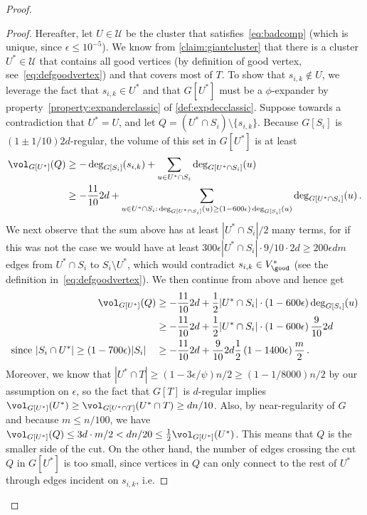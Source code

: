 \begin{proof}
\begin{proof}
	Hereafter, let $U \in \mathcal{U}$ be the cluster that satisfies~\eqref{eq:badcomp} (which is unique, since $\epsilon \le 10^{-5}$). We know from \cref{claim:giantcluster} that there is a cluster $U^* \in \mathcal{U}$ that contains all good vertices (by definition of good vertex, see~\eqref{eq:defgoodvertex}) and that covers most of $T$.	To show that $s_{i,k} \notin U$, we leverage the fact that $s_{i,k} \in U^*$ and that $G[U^*]$ must be a $\phi$-expander by property~\eqref{property:expanderclassic} of \cref{def:expdecclassic}. Suppose towards a contradiction that $U^* = U$, and let $Q = (U^* \cap S_i) \setminus \{s_{i,k}\}$. Because $G[S_i]$ is $(1 \pm 1/10)2d$-regular, the volume of this set in $G[U^*]$ is at least
	\begin{align*}
		\vol_{G[U^*]}(Q) & \ge -\deg_{G[S_i]}(s_{i,k}) + \sum_{u \in U^* \cap S_i} \deg_{G[U^* \cap S_i]}(u) \\
		& \ge  -\frac{11}{10}2d + \sum_{u \in U^* \cap S_i:\,\deg_{G[U^* \cap S_i]}(u) \ge (1-600{\epsilon}) \deg_{G[S_i]}(u)} \deg_{G[U^* \cap S_i]}(u) \, .
	\end{align*}
	We next observe that the sum above has at least $|U^* \cap S_i|/2$ many terms, for if this was not the case we would have at least $300\epsilon |U^* \cap S_i| \cdot 9/10 \cdot  2d \ge 200\epsilon dm$ edges from $U^* \cap S_i$ to $S_i \setminus U^*$, which would contradict $s_{i,k} \in V^*_{{\good}} $ (see the definition in~\eqref{eq:defgoodvertex}). We then continue from above and hence get
	\begin{align*}
		\vol_{G[U^*]}(Q) & \ge  -\frac{11}{10}2d + \frac{1}{2} |U^* \cap S_i|\cdot  \left(1-600{\epsilon}\right) \deg_{G[S_i]}(u)\\
		& \ge  -\frac{11}{10}2d + \frac{1}{2} |U^* \cap S_i|\cdot  \left(1-600{\epsilon}\right) \frac{9}{10} 2d\\
		\text{since $|S_i \cap U^*| \ge (1-700\epsilon) |S_i|$}\quad & \ge -\frac{11}{10}2d+\frac{9}{10}2d \frac{1}{2}\left(1-1400{\epsilon}\right) \frac{m}{2}\, .
	\end{align*}
	Moreover, we know that $|U^* \cap T| \ge (1-3\epsilon/\psi)n/2 \ge (1-1/8000)n/2$ by our assumption on $\epsilon$, so the fact that $G[T]$ is $d$-regular implies $\vol_{G[U^*]}(U^*) \ge \vol_{G[U^* \cap T]}(U^* \cap T) \ge dn/10$. Also, by near-regularity of $G$ and because $m \le n/100$, we have $\vol_{G[U^*]}(Q) \le 3d \cdot m/2 < dn/20 \le \frac{1}{2} \vol_{G[U^*]}(U^*)$. This means that $Q$ is the smaller side of the cut. On the other hand, the number of edges crossing the cut $Q$ in $G[U^*]$ is too small, since vertices in $Q$ can only connect to the rest of $U^*$ through edges incident on $s_{i,k}$, i.e.

\end{proof}
\end{proof}
